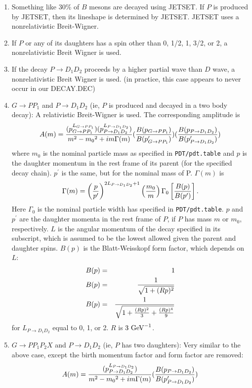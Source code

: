 \begin{enumerate}
\item Something like 30\% of $B$ mesons are decayed
using JETSET. If $P$ is produced by JETSET, then
its lineshape is determined by JETSET.  JETSET uses
a nonrelativistic Breit-Wigner.
\item If $P$ or any of its daughters has a spin other
than 0, 1/2, 1, 3/2, or 2,
a nonrelativistic Breit Wigner is used.
\item If the decay $P \to D_1 D_2$ proceeds by
a higher partial wave than $D$ wave, a nonrelativistic
Breit Wigner is used. (in practice, this case appears
to never occur in our DECAY.DEC)
\item $G \to P P_1$ and $P \to D_1 D_2$ (ie, $P$ is
produced and decayed in a two body decay): A relativistic
Breit-Wigner is used.  The corresponding amplitude is
\begin{equation}
A(m) = {{(p_{G \to P P_1}^{L_{G \to P P_1}} )
(p_{P \to D_1 D_2}^{L_{P \to D_1 D_2}})} \over {m^2 -{m_0}^2 + im \Gamma(m)}} 
({B(p_{G \to P P_1}) \over B(p^{\prime}_{G \to P P_1})})
({B(p_{P \to D_1 D_2}) \over B(p^{\prime}_{P \to D_1 D_2})})
\label{eq:ls}
\end{equation}
where $m_0$ is the nominal particle mass as specified
in {\tt PDT/pdt.table} and $p$ is the daughter
momentum in the rest frame of its parent (for the
specified decay chain). $p^{\prime}$ is the same, but for the nominal
mass of P.
$\Gamma(m)$ is
\begin{equation}
\Gamma(m) = \left( {p \over p^{\prime}} \right)^{2L_{P \to D_1 D_2}+1}
\left( m_0 \over m \right) \Gamma_0 
\left[ B(p) \over B(p^{\prime}) \right]. 
\label{eq:gamma}
\end{equation}
Here $\Gamma_0$ is the nominal particle width has
specified in {\tt PDT/pdt.table}.  $p$ and $p^{\prime}$
are the daughter momenta in the rest frame of $P$, 
if $P$ has mass $m$ or
$m_0$, respectively.  $L$ is the angular momentum
of the decay specified in its subscript, which is assumed 
to be the lowest allowed given the parent and daughter spins.
$B(p)$ is the Blatt-Weisskopf form factor, which depends on
$L$:
\begin{eqnarray}
B(p) &=& 1  \nonumber \\
B(p) &=& {1 \over \sqrt{1+(Rp)^2}} \nonumber \\
B(p) &=& {1 \over \sqrt{1+{(Rp)^2 \over 3} + {(Rp)^4 \over 9}}} 
\end{eqnarray}
for $L_{P \to D_1 D_2}$ equal to 0, 1, or 2. $R$ is $3~{\rm GeV}^{-1}$.
\item $G \to P P_1 P_2 X$ and $P \to D_1 D_2$ (ie, $P$ has
two daughters): Very similar to the above case, except the
birth momentum factor and form factor are removed:
\begin{equation}
A(m) = {{
(p_{P \to D_1 D_2}^{L_{P \to D_1 D_2}})} \over {m^2 -{m_0}^2 + im \Gamma(m)}} 
({B(p_{P \to D_1 D_2}) \over B(p^{\prime}_{P \to D_1 D_2})})
\label{eq:ls2}
\end{equation}



\end{enumerate}
